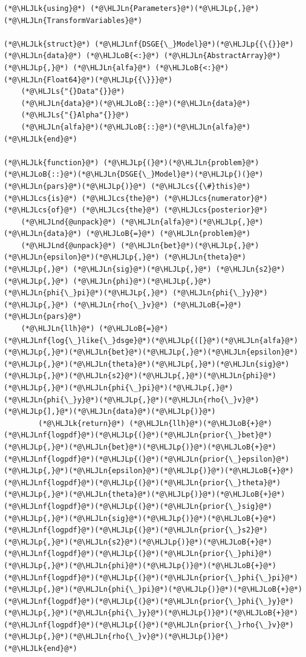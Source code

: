 \documentclass[12pt,a4paper]{article}
\newcommand{\HLJLk}[1]{\textcolor[RGB]{148,91,176}{\textbf{#1}}}
\newcommand{\HLJLn}[1]{#1}
\newcommand{\HLJLnd}[1]{\textcolor[RGB]{214,102,97}{#1}}
\newcommand{\HLJLnf}[1]{\textcolor[RGB]{66,102,213}{#1}}
\newcommand{\HLJLs}[1]{\textcolor[RGB]{201,61,57}{#1}}
\newcommand{\HLJLoB}[1]{\textcolor[RGB]{102,102,102}{\textbf{#1}}}
\newcommand{\HLJLp}[1]{#1}
\newcommand{\HLJLcs}[1]{\textcolor[RGB]{153,153,119}{\textit{#1}}}
\begin{document}
\begin{lstlisting}
(*@\HLJLk{using}@*) (*@\HLJLn{Parameters}@*)(*@\HLJLp{,}@*) (*@\HLJLn{TransformVariables}@*)

(*@\HLJLk{struct}@*) (*@\HLJLnf{DSGE{\_}Model}@*)(*@\HLJLp{{\{}}@*)(*@\HLJLn{data}@*) (*@\HLJLoB{<:}@*) (*@\HLJLn{AbstractArray}@*)(*@\HLJLp{,}@*) (*@\HLJLn{alfa}@*) (*@\HLJLoB{<:}@*) (*@\HLJLn{Float64}@*)(*@\HLJLp{{\}}}@*)
    (*@\HLJLs{"{}Data"{}}@*)
    (*@\HLJLn{data}@*)(*@\HLJLoB{::}@*)(*@\HLJLn{data}@*)
    (*@\HLJLs{"{}Alpha"{}}@*)
    (*@\HLJLn{alfa}@*)(*@\HLJLoB{::}@*)(*@\HLJLn{alfa}@*)
(*@\HLJLk{end}@*)

(*@\HLJLk{function}@*) (*@\HLJLp{(}@*)(*@\HLJLn{problem}@*)(*@\HLJLoB{::}@*)(*@\HLJLn{DSGE{\_}Model}@*)(*@\HLJLp{)(}@*)(*@\HLJLn{pars}@*)(*@\HLJLp{)}@*) (*@\HLJLcs{{\#}this}@*) (*@\HLJLcs{is}@*) (*@\HLJLcs{the}@*) (*@\HLJLcs{numerator}@*) (*@\HLJLcs{of}@*) (*@\HLJLcs{the}@*) (*@\HLJLcs{posterior}@*)
    (*@\HLJLnd{@unpack}@*) (*@\HLJLn{alfa}@*)(*@\HLJLp{,}@*) (*@\HLJLn{data}@*) (*@\HLJLoB{=}@*) (*@\HLJLn{problem}@*)
    (*@\HLJLnd{@unpack}@*) (*@\HLJLn{bet}@*)(*@\HLJLp{,}@*) (*@\HLJLn{epsilon}@*)(*@\HLJLp{,}@*) (*@\HLJLn{theta}@*)(*@\HLJLp{,}@*) (*@\HLJLn{sig}@*)(*@\HLJLp{,}@*) (*@\HLJLn{s2}@*)(*@\HLJLp{,}@*) (*@\HLJLn{phi}@*)(*@\HLJLp{,}@*) (*@\HLJLn{phi{\_}pi}@*)(*@\HLJLp{,}@*) (*@\HLJLn{phi{\_}y}@*)(*@\HLJLp{,}@*) (*@\HLJLn{rho{\_}v}@*) (*@\HLJLoB{=}@*) (*@\HLJLn{pars}@*)
    (*@\HLJLn{llh}@*) (*@\HLJLoB{=}@*) (*@\HLJLnf{log{\_}like{\_}dsge}@*)(*@\HLJLp{([}@*)(*@\HLJLn{alfa}@*)(*@\HLJLp{,}@*)(*@\HLJLn{bet}@*)(*@\HLJLp{,}@*)(*@\HLJLn{epsilon}@*)(*@\HLJLp{,}@*)(*@\HLJLn{theta}@*)(*@\HLJLp{,}@*)(*@\HLJLn{sig}@*)(*@\HLJLp{,}@*)(*@\HLJLn{s2}@*)(*@\HLJLp{,}@*)(*@\HLJLn{phi}@*)(*@\HLJLp{,}@*)(*@\HLJLn{phi{\_}pi}@*)(*@\HLJLp{,}@*)(*@\HLJLn{phi{\_}y}@*)(*@\HLJLp{,}@*)(*@\HLJLn{rho{\_}v}@*)(*@\HLJLp{],}@*)(*@\HLJLn{data}@*)(*@\HLJLp{)}@*)
        (*@\HLJLk{return}@*) (*@\HLJLn{llh}@*)(*@\HLJLoB{+}@*)(*@\HLJLnf{logpdf}@*)(*@\HLJLp{(}@*)(*@\HLJLn{prior{\_}bet}@*)(*@\HLJLp{,}@*)(*@\HLJLn{bet}@*)(*@\HLJLp{)}@*)(*@\HLJLoB{+}@*)(*@\HLJLnf{logpdf}@*)(*@\HLJLp{(}@*)(*@\HLJLn{prior{\_}epsilon}@*)(*@\HLJLp{,}@*)(*@\HLJLn{epsilon}@*)(*@\HLJLp{)}@*)(*@\HLJLoB{+}@*)(*@\HLJLnf{logpdf}@*)(*@\HLJLp{(}@*)(*@\HLJLn{prior{\_}theta}@*)(*@\HLJLp{,}@*)(*@\HLJLn{theta}@*)(*@\HLJLp{)}@*)(*@\HLJLoB{+}@*)(*@\HLJLnf{logpdf}@*)(*@\HLJLp{(}@*)(*@\HLJLn{prior{\_}sig}@*)(*@\HLJLp{,}@*)(*@\HLJLn{sig}@*)(*@\HLJLp{)}@*)(*@\HLJLoB{+}@*)(*@\HLJLnf{logpdf}@*)(*@\HLJLp{(}@*)(*@\HLJLn{prior{\_}s2}@*)(*@\HLJLp{,}@*)(*@\HLJLn{s2}@*)(*@\HLJLp{)}@*)(*@\HLJLoB{+}@*)(*@\HLJLnf{logpdf}@*)(*@\HLJLp{(}@*)(*@\HLJLn{prior{\_}phi}@*)(*@\HLJLp{,}@*)(*@\HLJLn{phi}@*)(*@\HLJLp{)}@*)(*@\HLJLoB{+}@*)(*@\HLJLnf{logpdf}@*)(*@\HLJLp{(}@*)(*@\HLJLn{prior{\_}phi{\_}pi}@*)(*@\HLJLp{,}@*)(*@\HLJLn{phi{\_}pi}@*)(*@\HLJLp{)}@*)(*@\HLJLoB{+}@*)(*@\HLJLnf{logpdf}@*)(*@\HLJLp{(}@*)(*@\HLJLn{prior{\_}phi{\_}y}@*)(*@\HLJLp{,}@*)(*@\HLJLn{phi{\_}y}@*)(*@\HLJLp{)}@*)(*@\HLJLoB{+}@*)(*@\HLJLnf{logpdf}@*)(*@\HLJLp{(}@*)(*@\HLJLn{prior{\_}rho{\_}v}@*)(*@\HLJLp{,}@*)(*@\HLJLn{rho{\_}v}@*)(*@\HLJLp{)}@*)
(*@\HLJLk{end}@*)


\end{lstlisting}
\end{document}

